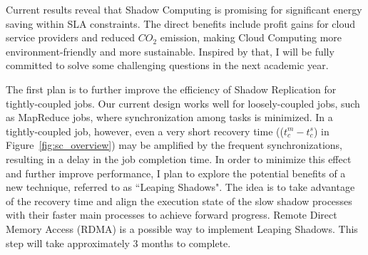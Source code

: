 Current results reveal that Shadow Computing is promising for significant energy saving within SLA constraints. The direct benefits include profit gains for cloud service providers and reduced $CO_2$ emission, making Cloud Computing more environment-friendly and more sustainable. Inspired by that, I will be fully committed to solve some challenging questions in the next academic year.

The first plan is to further improve the efficiency of Shadow Replication for tightly-coupled jobs. Our current design works well for loosely-coupled jobs, such as MapReduce jobs, where synchronization among tasks is minimized. 
 In a tightly-coupled job, however, even a very short recovery time \big(($t_c^m - t_c^s$) in Figure~\ref{fig:sc_overview}\big) may be amplified by the frequent synchronizations,  
 resulting in a delay in the job completion time. In order to minimize this effect and further improve performance, I plan to explore the potential benefits of a new technique, referred to as ``Leaping Shadows". The idea is to take advantage of the recovery time and align the execution state of the slow shadow processes with their faster main processes to achieve forward progress. Remote Direct Memory Access (RDMA) is a possible way to implement Leaping Shadows. This step will take approximately 3 months to complete. 

